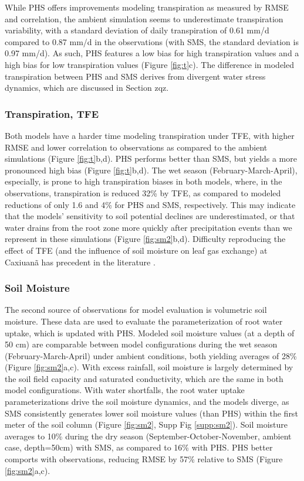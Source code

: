 \documentclass[draft,linenumbers]{agujournal}
\begin{document}
While PHS offers improvements modeling transpiration as measured by RMSE and correlation, the ambient simulation seems to underestimate transpiration variability, with a standard deviation of daily transpiration of 0.61 mm/d compared to 0.87 mm/d in the observations (with SMS, the standard deviation is 0.97 mm/d).
As such, PHS features a low bias for high transpiration values and a high bias for low transpiration values (Figure \ref{fig:t}c).
The difference in modeled transpiration between PHS and SMS derives from divergent water stress dynamics, which are discussed in Section zqz.

\subsubsection{Transpiration, TFE}
\label{sect:ttfe}
Both models have a harder time modeling transpiration under TFE, with higher RMSE and lower correlation to observations as compared to the ambient simulations (Figure \ref{fig:t}b,d).
PHS performs better than SMS, but yields a more pronounced high bias (Figure \ref{fig:t}b,d).
The wet season (February-March-April), especially, is prone to high transpiration biases in both models, where, in the observations, transpiration is reduced 32\% by TFE, as compared to modeled reductions of only 1.6 and 4\% for PHS and SMS, respectively.
This may indicate that the models' sensitivity to soil potential declines are underestimated, or that water drains from the root zone more quickly after precipitation events than we represent in these simulations (Figure \ref{fig:sm2}b,d).
Difficulty reproducing the effect of TFE (and the influence of soil moisture on leaf gas exchange) at Caxiuan\~a has precedent in the literature \citep{restrepo2017,powell2013}.

\subsubsection{Soil Moisture}
The second source of observations for model evaluation is volumetric soil moisture. 
These data are used to evaluate the parameterization of root water uptake, which is updated with PHS.
Modeled soil moisture values (at a depth of 50 cm) are comparable between model configurations during the wet season (February-March-April) under ambient conditions, both yielding averages of 28\% (Figure \ref{fig:sm2}a,c).
With excess rainfall, soil moisture is largely determined by the soil field capacity and saturated conductivity, which are the same in both model configurations.
With water shortfalls, the root water uptake parameterizations drive the soil moisture dynamics, and the models diverge, 
as SMS consistently generates lower soil moisture values (than PHS) within the first meter of the soil column (Figure \ref{fig:sm2}, Supp Fig \ref{supp:sm2}).
Soil moisture averages to 10\% during the dry season (September-October-November, ambient case, depth=50cm) with SMS, as compared to 16\% with PHS.
PHS better comports with observations, reducing RMSE by 57\% relative to SMS (Figure \ref{fig:sm2}a,c).
\end{document}
